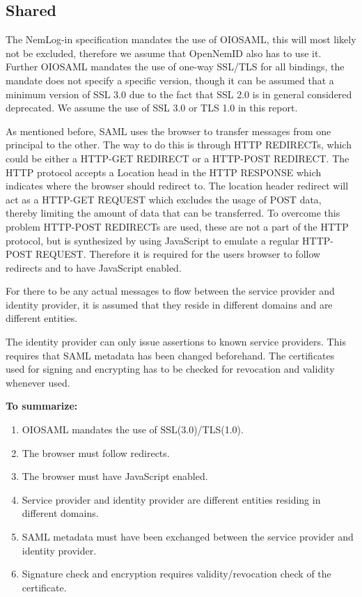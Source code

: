\documentclass[twosided]{report}
\begin{document}
\subsection{Shared}
The NemLog-in specification mandates the use of OIOSAML, this will most likely not be excluded, therefore we assume that OpenNemID also has to use it. Further OIOSAML mandates the use of one-way SSL/TLS for all bindings, the mandate does not specify a specific version, though it can be assumed that a minimum version of SSL 3.0 due to the fact that SSL 2.0 is in general considered deprecated. We assume the use of SSL 3.0 or TLS 1.0 in this report.
\par
As mentioned before, SAML uses the browser to transfer messages from one principal to the other. The way to do this is through HTTP REDIRECTs, which could be either a HTTP-GET REDIRECT or a HTTP-POST REDIRECT. The HTTP protocol accepts a Location head in the HTTP RESPONSE which indicates where the browser should redirect to. The location header redirect will act as a HTTP-GET REQUEST which excludes the usage of POST data, thereby limiting the amount of data that can be transferred. To overcome this problem HTTP-POST REDIRECTs are used, these are not a part of the HTTP protocol, but is synthesized by using JavaScript to emulate a regular HTTP-POST REQUEST. Therefore it is required for the users browser to follow redirects and to have JavaScript enabled.
\par
For there to be any actual messages to flow between the service provider and identity provider, it is assumed that they reside in different domains and are different entities.
\par
The identity provider can only issue assertions to known service providers. This requires that SAML metadata has been changed beforehand. The certificates used for signing and encrypting has to be checked for revocation and validity whenever used.
\\
\par
\textbf{To summarize:}
\begin{enumerate}
	\item OIOSAML mandates the use of SSL(3.0)/TLS(1.0).
	\item The browser must follow redirects.
	\item The browser must have JavaScript enabled.
	\item Service provider and identity provider are different entities residing in different domains.
	\item SAML metadata must have been exchanged between the service provider and identity provider.
	\item Signature check and encryption requires validity/revocation check of the certificate.
\end{enumerate}
\end{document}

